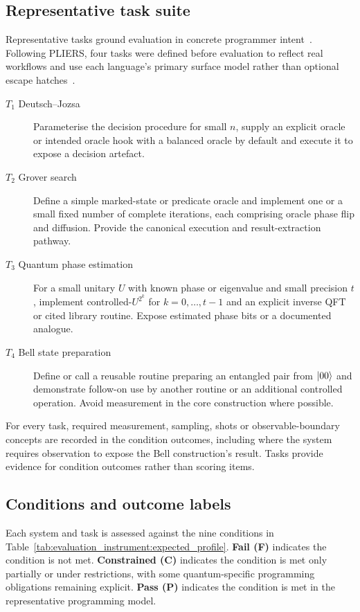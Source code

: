 \subsection{Representative task suite}\label{subsec:evaluation_instrument:task_suite}
Representative tasks ground evaluation in concrete programmer intent~\cite{Myers2016PLUsabilitySIG}.
Following PLIERS, four tasks were defined before evaluation to reflect real workflows and use each language's primary surface model rather than optional escape hatches~\cite{Coblenz2021PLIERS}.

\begin{description}
    \item[$T_1$ Deutsch--Jozsa]
    Parameterise the decision procedure for small $n$, supply an explicit oracle or intended oracle hook with a balanced oracle by default and execute it to expose a decision artefact.

    \item[$T_2$ Grover search]
    Define a simple marked-state or predicate oracle and implement one or a small fixed number of complete iterations, each comprising oracle phase flip and diffusion.
    Provide the canonical execution and result-extraction pathway.

    \item[$T_3$ Quantum phase estimation]
    For a small unitary $U$ with known phase or eigenvalue and small precision $t$, implement controlled-$U^{2^k}$ for $k=0,\ldots,t-1$ and an explicit inverse QFT or cited library routine.
    Expose estimated phase bits or a documented analogue.

    \item[$T_4$ Bell state preparation]
    Define or call a reusable routine preparing an entangled pair from $\ket{00}$ and demonstrate follow-on use by another routine or an additional controlled operation.
    Avoid measurement in the core construction where possible.
\end{description}

For every task, required measurement, sampling, shots or observable-boundary concepts are recorded in the condition outcomes, including where the system requires observation to expose the Bell construction's result.
Tasks provide evidence for condition outcomes rather than scoring items.

\subsection{Conditions and outcome labels}\label{subsec:evaluation_instrument:conditions}
Each system and task is assessed against the nine conditions in Table~\ref{tab:evaluation_instrument:expected_profile}.
\textbf{Fail (F)} indicates the condition is not met.
\textbf{Constrained (C)} indicates the condition is met only partially or under restrictions, with some quantum-specific programming obligations remaining explicit.
\textbf{Pass (P)} indicates the condition is met in the representative programming model.

